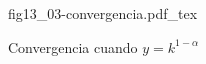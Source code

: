 \begin{figure}[h]
\centering
\def\svgwidth{0.5\textwidth}
{fig13_03-convergencia.pdf_tex}
\caption{Convergencia cuando $y=k^{1-\alpha}$}
\label{fig13_03-convergencia}
\end{figure}